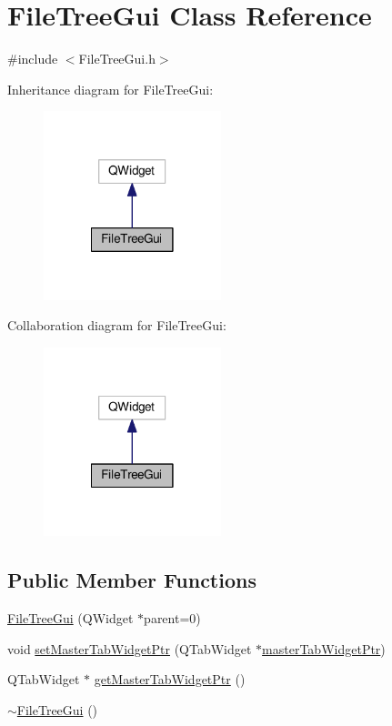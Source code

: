 \hypertarget{class_file_tree_gui}{\section{File\-Tree\-Gui Class Reference}
\label{class_file_tree_gui}
}


{\ttfamily \#include $<$File\-Tree\-Gui.\-h$>$}



Inheritance diagram for File\-Tree\-Gui\-:\nopagebreak
\begin{figure}[H]
\begin{center}
\leavevmode
\includegraphics[width=146pt]{class_file_tree_gui__inherit__graph}
\end{center}
\end{figure}


Collaboration diagram for File\-Tree\-Gui\-:\nopagebreak
\begin{figure}[H]
\begin{center}
\leavevmode
\includegraphics[width=146pt]{class_file_tree_gui__coll__graph}
\end{center}
\end{figure}
\subsection*{Public Member Functions}
\begin{DoxyCompactItemize}
\item 
\hyperlink{class_file_tree_gui_acf857f2793adefb176a680d541c24691}{File\-Tree\-Gui} (Q\-Widget $\ast$parent=0)
\item 
void \hyperlink{class_file_tree_gui_a571ca6424f269c0035ae9ddbce2e9e60}{set\-Master\-Tab\-Widget\-Ptr} (Q\-Tab\-Widget $\ast$\hyperlink{class_file_tree_gui_adb1e3ecfaab582317fcd9b968bbf6c40}{master\-Tab\-Widget\-Ptr})
\item 
Q\-Tab\-Widget $\ast$ \hyperlink{class_file_tree_gui_ab4c244617e4a8fbc13608cf5cfcf6944}{get\-Master\-Tab\-Widget\-Ptr} ()
\item 
\hyperlink{class_file_tree_gui_a11cc4baa3a62a625e95155c27a0d7258}{$\sim$\-File\-Tree\-Gui} ()
\end{DoxyCompactItemize}
